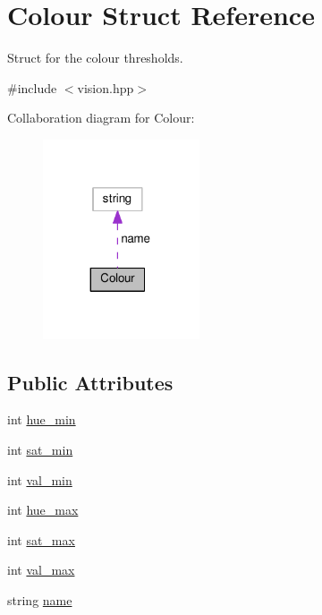 \hypertarget{struct_colour}{}\section{Colour Struct Reference}
\label{struct_colour}


Struct for the colour thresholds.  




{\ttfamily \#include $<$vision.\+hpp$>$}



Collaboration diagram for Colour\+:\nopagebreak
\begin{figure}[H]
\begin{center}
\leavevmode
\includegraphics[width=131pt]{struct_colour__coll__graph}
\end{center}
\end{figure}
\subsection*{Public Attributes}
\begin{DoxyCompactItemize}
\item 
int \hyperlink{struct_colour_ad80795d6cb069ebb1ba58d21dc431a1f}{hue\+\_\+min}
\item 
int \hyperlink{struct_colour_a060d31cb0c6cd91881d3b194878ecc9c}{sat\+\_\+min}
\item 
int \hyperlink{struct_colour_ac9491a53fac7ac1d76a3a0fb3845ac18}{val\+\_\+min}
\item 
int \hyperlink{struct_colour_ad5bb23b460d5d34079ae34e7e1c0940c}{hue\+\_\+max}
\item 
int \hyperlink{struct_colour_afe350ccf1ecf2dbf5f414ba869878d65}{sat\+\_\+max}
\item 
int \hyperlink{struct_colour_abc073c89d95297937d9743f52170e853}{val\+\_\+max}
\item 
string \hyperlink{struct_colour_a4a7225c84050a0d8d9164643a0ccbbd2}{name}
\end{DoxyCompactItemize}


